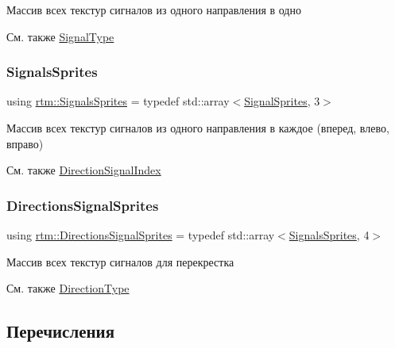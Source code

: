 Массив всех текстур сигналов из одного направления в одно \begin{DoxySeeAlso}{См. также}
\hyperlink{namespacertm_aadb7300c15d57429546fb0b7f8ee0ee6}{Signal\+Type} 
\end{DoxySeeAlso}
\mbox{\label{namespacertm_a260109b3376dc38095724ee80ed72d8e}} 
\subsubsection{\texorpdfstring{Signals\+Sprites}{SignalsSprites}}
{\footnotesize\ttfamily using \hyperlink{namespacertm_a260109b3376dc38095724ee80ed72d8e}{rtm\+::\+Signals\+Sprites} = typedef std\+::array$<$\hyperlink{namespacertm_ab6c6acbd1378bfe5755d77179a7131ff}{Signal\+Sprites}, 3$>$}

Массив всех текстур сигналов из одного направления в каждое (вперед, влево, вправо) \begin{DoxySeeAlso}{См. также}
\hyperlink{namespacertm_a27eb93235356cdffe25fe6628e7eff14}{Direction\+Signal\+Index} 
\end{DoxySeeAlso}
\mbox{\label{namespacertm_ac9f276c8ed33ee992eb1a1f04a8254a0}} 
\subsubsection{\texorpdfstring{Directions\+Signal\+Sprites}{DirectionsSignalSprites}}
{\footnotesize\ttfamily using \hyperlink{namespacertm_ac9f276c8ed33ee992eb1a1f04a8254a0}{rtm\+::\+Directions\+Signal\+Sprites} = typedef std\+::array$<$\hyperlink{namespacertm_a260109b3376dc38095724ee80ed72d8e}{Signals\+Sprites}, 4$>$}

Массив всех текстур сигналов для перекрестка \begin{DoxySeeAlso}{См. также}
\hyperlink{namespacertm_a57b216f3aeb45041f3461bab08bc3aeb}{Direction\+Type} 
\end{DoxySeeAlso}


\subsection{Перечисления}
\mbox{\label{namespacertm_a69dc82b16a0148c10962caa83d930f89}} 
